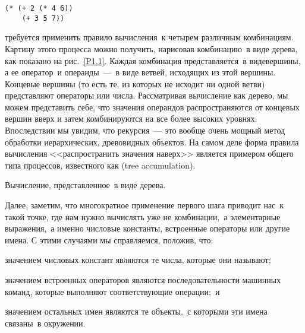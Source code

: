 \begin{Verbatim}[fontsize=\small]
 (* (+ 2 (* 4 6))
    (+ 3 5 7))
\end{Verbatim}
требуется применить правило вычисления~к четырем различным
комбинациям.  Картину этого процесса можно получить, нарисовав 
комбинацию~в виде дерева, как показано на
рис.~\ref{P1.1}. Каждая комбинация
представляется~в видевершины, а
ее оператор~и операнды~---~в виде 
ветвей, исходящих из этой вершины.
Концевые вершины (то есть те, из которых
не исходит ни одной ветви) представляют операторы или числа.
Рассматривая вычисление как дерево, мы можем представить себе, что
значения операндов распространяются от концевых вершин вверх и
затем комбинируются на все более высоких уровнях.  Впоследствии мы увидим, что
рекурсия~--- это вообще очень мощный метод обработки иерархических,
древовидных объектов.  На самом деле форма правила вычисления <<распространить
значения наверх>> является примером общего типа процессов, известного
как  (tree accumulation).

\begin{cntrfig}

\caption{Вычисление, представленное~в виде дерева.}
\label{P1.1}
\end{cntrfig}

Далее, заметим, что многократное применение
первого шага приводит нас~к такой точке, где нам нужно вычислять уже не
комбинации,~а элементарные выражения,~а именно числовые константы, встроенные
операторы или другие имена. С этими случаями мы справляемся,
положив, что:

\begin{plainlist}
\sloppy
\item
  значением числовых констант являются те
  числа, которые они называют;
\item
  значением встроенных операторов являются
  последовательности ма\-шинных команд, которые выполняют соответствующие
  операции;~и %
\item
  значением остальных имен являются те
  объекты,~с которыми эти имена связаны~в окружении.
\end{plainlist}

